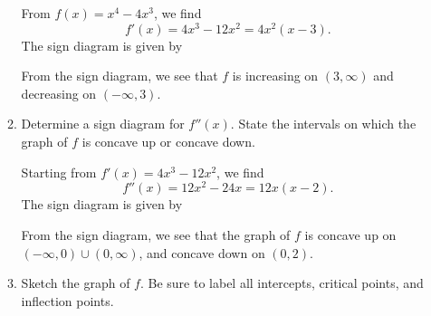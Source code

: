 \documentclass[12pt]{article}
\newcommand{\points}[1]{\marginpar{\hspace{24pt}[#1]}}
\begin{document}
\begin{enumerate}
\begin{enumerate}
 \medskip
 
 From $f(x)=x^4-4x^3$, we find
 \[
 f'(x) = 4x^3-12x^2 = 4x^2(x-3).
 \]
 The sign diagram is given by
  \begin{center}
\end{center}
From the sign diagram, we see that $f$ is increasing on $(3,\infty)$  and decreasing on $(-\infty,3)$.

 \item Determine a sign diagram for $f''(x)$.\points{3} State the intervals on which the graph of $f$ is concave up or concave down.
 
 \medskip
 
Starting from $f'(x) = 4x^3-12x^2$, we find
\[
f''(x) = 12x^2-24x=12x(x-2).
\]
The sign diagram is given by
 \begin{center}
\end{center}
From the sign diagram, we see that the graph of $f$ is concave up on $(-\infty,0)\cup (0,\infty)$, and concave down on $(0,2)$.

 \item Sketch the graph of $f$.\points{2} Be sure to label all intercepts, critical points, and inflection points.
 
 \medskip
 

\end{enumerate}
\end{enumerate}
\end{document}
